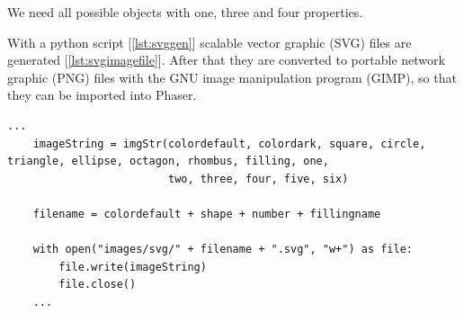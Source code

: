 We need all possible objects with one, three and four properties.

With a python script [\ref{lst:svggen}] scalable vector graphic (SVG) files are generated [\ref{lst:svgimagefile}].
After that they are converted to portable network graphic (PNG) files with the GNU image manipulation program (GIMP),
so that they can be imported into Phaser.

\begin{lstlisting}[style=TypeScript, caption={SVG Generation}, label={lst:svggen}]
    ...
    imageString = imgStr(colordefault, colordark, square, circle, triangle, ellipse, octagon, rhombus, filling, one,
                         two, three, four, five, six)

    filename = colordefault + shape + number + fillingname

    with open("images/svg/" + filename + ".svg", "w+") as file:
        file.write(imageString)
        file.close()
    ...
\end{lstlisting}

